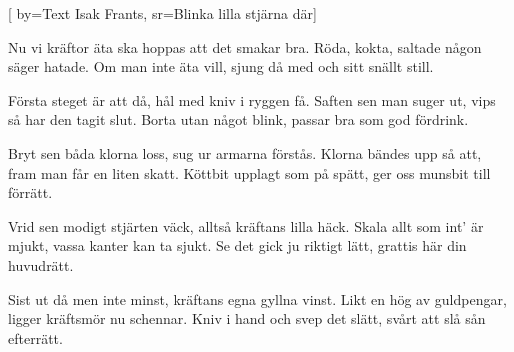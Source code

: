 [ 		
	by={Text Isak Frants},		
	sr={Blinka lilla stjärna där}]										

	
\beginverse*						
Nu vi kräftor äta ska
hoppas att det smakar bra.
Röda, kokta, saltade
någon säger hatade.
Om man inte äta vill,
sjung då med och sitt snällt still. 
\endverse						

\beginverse				
Första steget är att då,
hål med kniv i ryggen få.
Saften sen man suger ut,
vips så har den tagit slut.
Borta utan något blink,
passar bra som god fördrink.
\endverse				

\beginverse				
Bryt sen båda klorna loss,
sug ur armarna förstås.
Klorna bändes upp så att, 
fram man får en liten skatt.
Köttbit upplagt som på spätt,
ger oss munsbit till förrätt.
\endverse				

\beginverse				
Vrid sen modigt stjärten väck,
alltså kräftans lilla häck. 
Skala allt som int' är mjukt,
vassa kanter kan ta sjukt.
Se det gick ju riktigt lätt,
grattis här din huvudrätt.
\endverse				

\beginverse				
Sist ut då men inte minst,
kräftans egna gyllna vinst.
Likt en hög av guldpengar,
ligger kräftsmör nu schennar. 
Kniv i hand och svep det slätt,
svårt att slå sån efterrätt.
\endverse				
\endsong	
